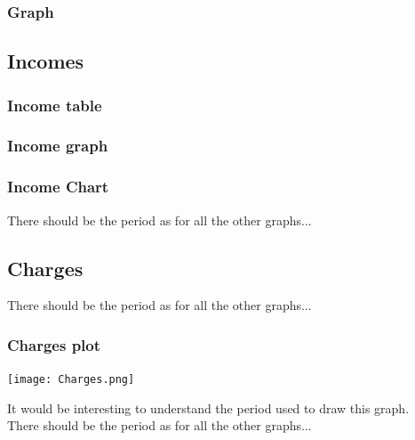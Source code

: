 \documentclass[8pt]{article} %
\begin{document}
\subsubsection{Graph}
%
%


\subsection{Incomes}
%

\subsubsection{Income table}


\subsubsection{Income graph}


\subsubsection{Income Chart}


There should be the period as for all the other graphs...\\

\subsection{Charges}


There should be the period as for all the other graphs...\\

\subsubsection{Charges plot}
\texttt{[image: Charges.png]}

It would be interesting to understand the period used to draw this graph.\\
There should be the period as for all the other graphs...\\
\end{document}
